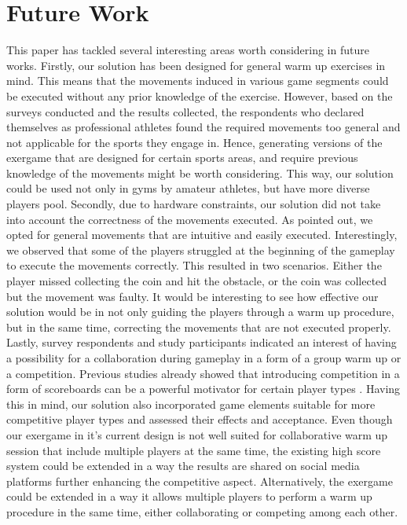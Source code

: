 \section{Future Work}
This paper has tackled several interesting areas worth considering in future works. 
Firstly, our solution has been designed for general warm up exercises in mind. This means that the movements induced in various game segments could be executed without any prior knowledge of the exercise. However, based on the surveys conducted and the results collected, the respondents who declared themselves as professional athletes found the required movements too general and not applicable for the sports they engage in. Hence, generating versions of the exergame that are designed for certain sports areas, and require previous knowledge of the movements might be worth considering. This way, our solution could be used not only in gyms by amateur athletes, but have more diverse players pool. Secondly, due to hardware constraints, our solution did not take into account the correctness of the movements executed. As pointed out, we opted for general movements that are intuitive and easily executed. Interestingly, we observed that some of the players struggled at the beginning of the gameplay to execute the movements correctly. This resulted in two scenarios. Either the player missed collecting the coin and hit the obstacle, or the coin was collected but the movement was faulty. It would be interesting to see how effective our solution would be in not only guiding the players through a warm up procedure, but in the same time, correcting the movements that are not executed properly. Lastly, survey respondents and study participants indicated an interest of having a possibility for a collaboration during gameplay in a form of a group warm up or a competition. Previous studies already showed that introducing competition in a form of scoreboards can be a powerful motivator for certain player types \cite{zichermann2011gamification, werbach2012win}. Having this in mind, our solution also incorporated game elements suitable for more competitive player types and assessed their effects and acceptance. Even though our exergame in it's current design is not well suited for collaborative warm up session that include multiple players at the same time, the existing high score system could be extended in a way the results are shared on social media platforms further enhancing the competitive aspect. Alternatively, the exergame could be extended in a way it allows multiple players to perform a warm up procedure in the same time, either collaborating or competing among each other. 